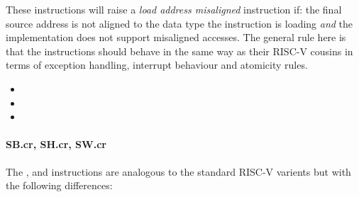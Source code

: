 These instructions will raise a {\em load address misaligned} instruction
if: the final source address is not aligned to the data type the instruction
is loading {\em and} the implementation does not support misaligned accesses.
The general rule here is that the  instructions should behave in
the same way as their RISC-V cousins in terms of exception handling,
interrupt behaviour and atomicity rules.

\begin{itemize}
\item {}
\item {}
\item {}
\end{itemize}


\paragraph{SB.cr, SH.cr, SW.cr}

The ,  and  instructions are analogous to
the standard RISC-V varients but with the following differences:

